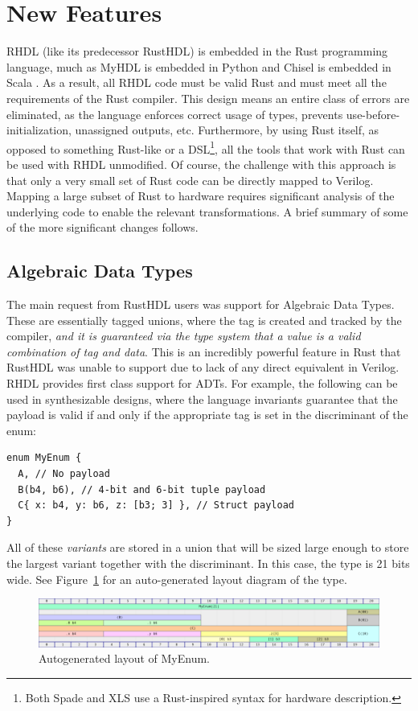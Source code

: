 \documentclass[sigplan,screen,sigconf]{acmart}
\begin{document}
\section{New Features}
RHDL (like its predecessor RustHDL) is embedded in the Rust programming language, much as 
MyHDL is embedded in Python\cite{b3} and Chisel is embedded in Scala \cite{b2}.  As a result,
all RHDL code must be valid Rust and must meet all the requirements of the Rust compiler.  This design means an entire class of errors are eliminated, as the language enforces correct usage of types, prevents use-before-initialization, unassigned outputs, etc.  Furthermore, by using Rust itself, as opposed to something Rust-like or a DSL\footnote{Both Spade \cite{b1} and XLS \cite{b4} use a Rust-inspired syntax for hardware description.}, all the tools that work with Rust can be used with RHDL unmodified.  Of course, the challenge with this approach is that only a very small set of Rust code can be directly mapped to Verilog.  Mapping a large subset of Rust to hardware requires significant analysis of the underlying code to enable the relevant transformations.  A brief summary of some of the more significant changes follows.

\subsection{Algebraic Data Types}
The main request from RustHDL users was support for Algebraic Data Types. These are essentially tagged unions, where the tag is created and tracked by the compiler, \emph{and it is guaranteed via the type system that a value is a valid combination of tag and data}.  This is an incredibly powerful feature in Rust that RustHDL was unable to support due to lack of any direct equivalent in Verilog.  RHDL provides first class support for ADTs. For example, the following can be used in synthesizable designs, where the language invariants guarantee that the payload is valid if and only if the appropriate tag is set in the discriminant of the enum:
\begin{verbatim}
enum MyEnum {
  A, // No payload
  B(b4, b6), // 4-bit and 6-bit tuple payload
  C{ x: b4, y: b6, z: [b3; 3] }, // Struct payload
}
\end{verbatim}
All of these \emph{variants} are stored in a union that will be sized large enough to store the largest variant together with the discriminant.  In this case, the type is 21 bits wide.  See Figure~\ref{fig:my_enum} for an auto-generated layout diagram of the type.
\begin{figure}[h]
  \centering
  \includegraphics[width=15cm]{my_enum.png}
  \caption{Autogenerated layout of MyEnum.} \label{fig:my_enum}
\end{figure}
\end{document}
